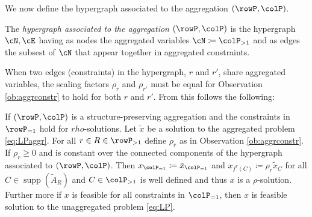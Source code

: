 \documentclass[smallextended,natbib]{svjour3}       %
\DeclareMathOperator{\supp}{supp}
\numberwithin{theorem}{section}
\begin{document}
We now define the hypergraph associated to the aggregation \((\rowP, \colP)\).
\begin{definition}
  The \emph{hypergraph associated to the aggregation \((\rowP, \colP)\)} is the hypergraph \(\cN, \cE\) having as nodes the aggregated variables \(\cN \coloneqq \colP_{>1}\) and as edges the subsest of \(\cN\) that appear together in aggregated constraints.
\end{definition}

When two edges (constraints) in the hypergraph, \(r\) and \(r'\), share aggregated variables, 
the scaling factors \(\rho_r\) and \(\rho_{r'}\) must be equal for Observation \ref{ob:aggrconstr} to hold for both \(r\) and \(r'\). 
From this follows the following:
\begin{proposition}
\label{prop:xaggfeasible}
If \((\rowP, \colP)\) is a structure-preserving aggregation and the constraints in \(\rowP_{=1}\) hold for \(rho\)-solutions. Let \(\tilde{x}\) be a solution 
to the aggregated problem \eqref{eq:LPaggr}. For all \(r \in R \in \rowP_{>1}\) define \(\rho_r\) as in Observation \ref{ob:aggrconstr}. If \(\rho_r \geq 0\) and is constant over the connected components of the hypergraph associated to \((\rowP, \colP)\). 
Then \(x_{\colP_{=1}} \coloneqq \tilde{x}_{\colP_{=1}}\) and \(x_{f^r(C)} \coloneqq \rho_r \tilde{x}_C\) for all \(C \in \supp(\tilde{A}_R)\) and \(C \in \colP_{>1}\) is well defined and thus \(x\) is a \(\rho\)-solution.
Further more if \(x\) is feasible for all constraints in \(\colP_{=1}\), then \(x\) is feasible solution to the unaggregated problem \eqref{eq:LP}.
\end{proposition}
\end{document}
